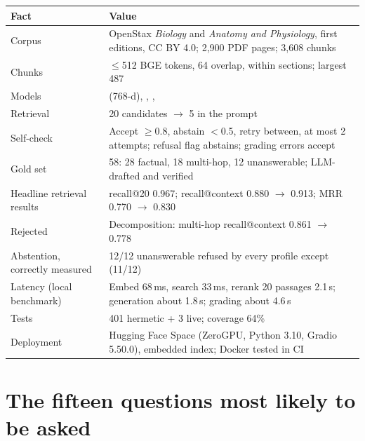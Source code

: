 \begin{center}
\begin{tabularx}{\textwidth}{@{}>{\raggedright\arraybackslash}p{5.2cm}L@{}}
\toprule
\textbf{Fact} & \textbf{Value}\\
\midrule
Corpus & OpenStax \emph{Biology} and \emph{Anatomy and Physiology}, first editions, CC BY 4.0; 2,900 PDF pages; 3,608 chunks\\
Chunks & $\le$512 BGE tokens, 64 overlap, within sections; largest 487\\
Models &  (768-d), , , \\
Retrieval & 20 candidates $\rightarrow$ 5 in the prompt\\
Self-check & Accept $\ge$0.8, abstain $<$0.5, retry between, at most 2 attempts; refusal flag abstains; grading errors accept\\
Gold set & 58: 28 factual, 18 multi-hop, 12 unanswerable; LLM-drafted and verified\\
Headline retrieval results & recall@20 0.967; recall@context 0.880 $\rightarrow$ 0.913; MRR 0.770 $\rightarrow$ 0.830\\
Rejected & Decomposition: multi-hop recall@context 0.861 $\rightarrow$ 0.778\\
Abstention, correctly measured & 12/12 unanswerable refused by every profile except  (11/12)\\
Latency (local benchmark) & Embed 68\,ms, search 33\,ms, rerank 20 passages 2.1\,s; generation about 1.8\,s; grading about 4.6\,s\\
Tests & 401 hermetic + 3 live; coverage 64\%\\
Deployment & Hugging Face Space (ZeroGPU, Python 3.10, Gradio 5.50.0), embedded index; Docker tested in CI\\
\bottomrule
\end{tabularx}
\end{center}

\section{The fifteen questions most likely to be asked}

